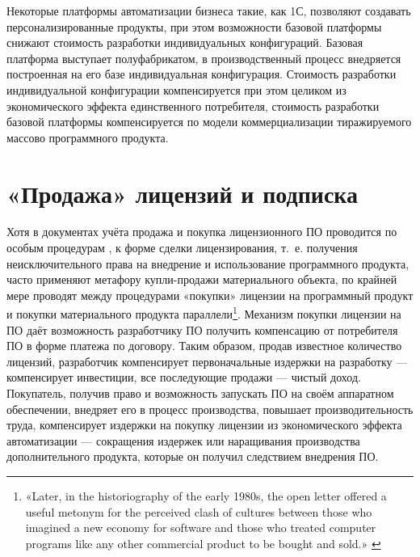 \documentclass{article}
\begin{document}
Некоторые платформы автоматизации бизнеса такие, как 1С, позволяют создавать персонализированные продукты, при этом возможности базовой платформы снижают стоимость разработки индивидуальных конфигураций. Базовая платформа выступает полуфабрикатом, в производственный процесс внедряется построенная на его базе индивидуальная конфигурация. Стоимость разработки индивидуальной конфигурации компенсируется при этом целиком из экономического эффекта единственного потребителя, стоимость разработки базовой платформы компенсируется по модели коммерциализации тиражируемого массово программного продукта.

\section*{«Продажа» лицензий и подписка}

Хотя в документах учёта продажа и покупка лицензионного ПО проводится по особым процедурам \cite{accountingIAS, accountingNKRF257, accountingNKRF264}, к форме сделки лицензирования, т.~е. получения неисключительного права на внедрение и использование программного продукта, часто применяют метафору купли-продажи материального объекта, по крайней мере проводят между процедурами «покупки» лицензии на программный продукт и покупки материального продукта параллели\footnote{«Later, in the historiography of the early 1980s, the open letter offered a useful metonym for the perceived clash of cultures between those who imagined a new economy for software and those who treated computer programs like any other commercial product to be bought and sold.» \cite{driscollOpenLetter}}. Механизм покупки лицензии на ПО даёт возможность разработчику ПО получить компенсацию от потребителя ПО в форме платежа по договору. Таким образом, продав известное количество лицензий, разработчик компенсирует первоначальные издержки на разработку — компенсирует инвестиции, все последующие продажи — чистый доход. Покупатель, получив право и возможность запускать ПО на своём аппаратном обеспечении, внедряет его в процесс производства, повышает производительность труда, компенсирует издержки на покупку лицензии из экономического эффекта автоматизации — сокращения издержек или наращивания производства дополнительного продукта, которые он получил следствием внедрения ПО.
\end{document}

